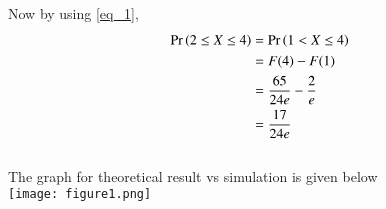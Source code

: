\documentclass[journal,12pt,twocolumn]{IEEEtran}
\begin{document}
Now by using \ref{eq_1},
\begin{align}
    \Pr\left(2 \leq X \leq 4\right) 
    & = \Pr\left(1 < X \leq 4\right)\\
    & = F(4)-F(1)\\
    & = \frac{65}{24e}-\frac{2}{e}\\
    & = \frac{17}{24e}
\end{align}\\

The graph for theoretical result vs simulation is given below\\
\texttt{[image: figure1.png]}
 
\end{document}
